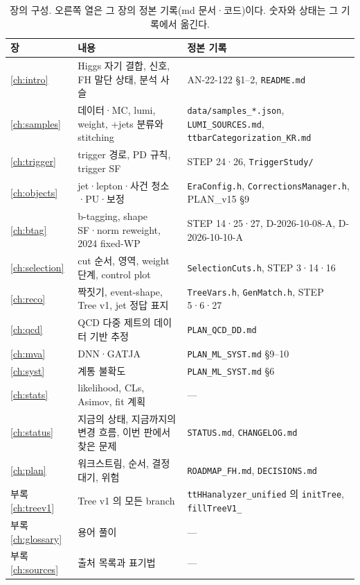 \begin{table}[htbp]\centering
\caption{장의 구성. 오른쪽 열은 그 장의 정본 기록(md 문서·코드)이다. 숫자와 상태는 그 기록에서 옮긴다.}\label{tab:about-map}
\small
\begin{tabularx}{\linewidth}{@{}l L L@{}}
\toprule
장 & 내용 & 정본 기록 \\
\midrule
\ref{ch:intro} & Higgs 자기 결합, \ttHH{} 신호, FH 말단 상태, 분석 사슬 & AN-22-122 §1–2, \texttt{README.md} \\
\ref{ch:samples} & 데이터·MC, lumi, weight, \ttbar{}+jets 분류와 stitching & \texttt{data/samples\_*.json}, \texttt{LUMI\_SOURCES.md}, \texttt{ttbarCategorization\_KR.md} \\
\ref{ch:trigger} & trigger 경로, PD 규칙, trigger SF & STEP 24·26, \texttt{TriggerStudy/} \\
\ref{ch:objects} & jet·lepton·사건 청소·PU·보정 & \texttt{EraConfig.h}, \texttt{CorrectionsManager.h}, PLAN\_v15 §9 \\
\ref{ch:btag} & b-tagging, shape SF·norm reweight, 2024 fixed-WP & STEP 14·25·27, D-2026-10-08-A, D-2026-10-10-A \\
\ref{ch:selection} & cut 순서, 영역, weight 단계, control plot & \texttt{SelectionCuts.h}, STEP 3·14·16 \\
\ref{ch:reco} & \chisq{} 짝짓기, event-shape, Tree v1, jet 정답 표지 & \texttt{TreeVars.h}, \texttt{GenMatch.h}, STEP 5·6·27 \\
\ref{ch:qcd} & QCD 다중 제트의 데이터 기반 추정 & \texttt{PLAN\_QCD\_DD.md} \\
\ref{ch:mva} & DNN·GATJA & \texttt{PLAN\_ML\_SYST.md} §9–10 \\
\ref{ch:syst} & 계통 불확도 & \texttt{PLAN\_ML\_SYST.md} §6 \\
\ref{ch:stats} & likelihood, CLs, Asimov, fit 계획 & — \\
\ref{ch:status} & 지금의 상태, 지금까지의 변경 흐름, 이번 판에서 찾은 문제 & \texttt{STATUS.md}, \texttt{CHANGELOG.md} \\
\ref{ch:plan} & 워크스트림, 순서, 결정 대기, 위험 & \texttt{ROADMAP\_FH.md}, \texttt{DECISIONS.md} \\
부록 \ref{ch:treev1} & Tree v1 의 모든 branch & \texttt{ttHHanalyzer\_unified} 의 \texttt{initTree}, \texttt{fillTreeV1\_} \\
부록 \ref{ch:glossary} & 용어 풀이 & — \\
부록 \ref{ch:sources} & 출처 목록과 표기법 & — \\
\bottomrule
\end{tabularx}
\end{table}

